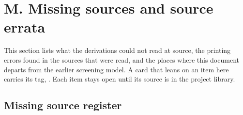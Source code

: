 \section{M. Missing sources and source errata}\label{sec:M}

This section lists what the derivations could not read at source, the printing errors found in the sources that were read, and the places where this document departs from the earlier screening model. A card that leans on an item here carries its tag, . Each item stays open until its source is in the project library.

\subsection*{Missing source register}

